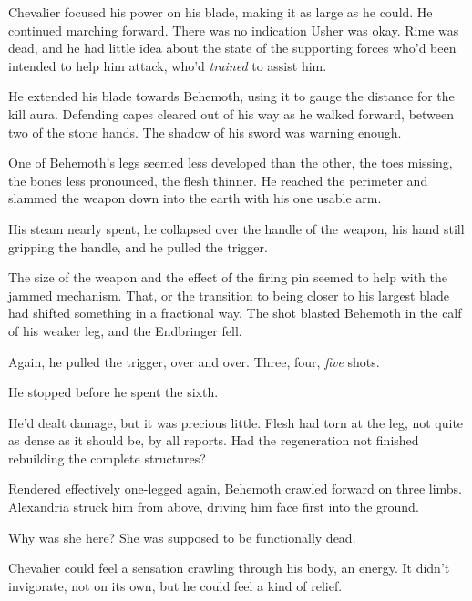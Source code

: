 Chevalier focused his power on his blade, making it as large as he could.  He continued marching forward.  There was no indication Usher was okay.  Rime was dead, and he had little idea about the state of the supporting forces who'd been intended to help him attack, who'd \emph{trained }to assist him.



He extended his blade towards Behemoth, using it to gauge the distance for the kill aura.  Defending capes cleared out of his way as he walked forward, between two of the stone hands.  The shadow of his sword was warning enough.



One of Behemoth's legs seemed less developed than the other, the toes missing, the bones less pronounced, the flesh thinner.  He reached the perimeter and slammed the weapon down into the earth with his one usable arm.



His steam nearly spent, he collapsed over the handle of the weapon, his hand still gripping the handle, and he pulled the trigger.



The size of the weapon and the effect of the firing pin seemed to help with the jammed mechanism.  That, or the transition to being closer to his largest blade had shifted something in a fractional way.  The shot blasted Behemoth in the calf of his weaker leg, and the Endbringer fell.



Again, he pulled the trigger, over and over.  Three, four, \emph{five} shots.



He stopped before he spent the sixth.



He'd dealt damage, but it was precious little.  Flesh had torn at the leg, not quite as dense as it should be, by all reports.  Had the regeneration not finished rebuilding the complete structures?



Rendered effectively one-legged again, Behemoth crawled forward on three limbs.  Alexandria struck him from above, driving him face first into the ground.



Why was she here?  She was supposed to be functionally dead.



Chevalier could feel a sensation crawling through his body, an energy.  It didn't invigorate, not on its own, but he could feel a kind of relief.



